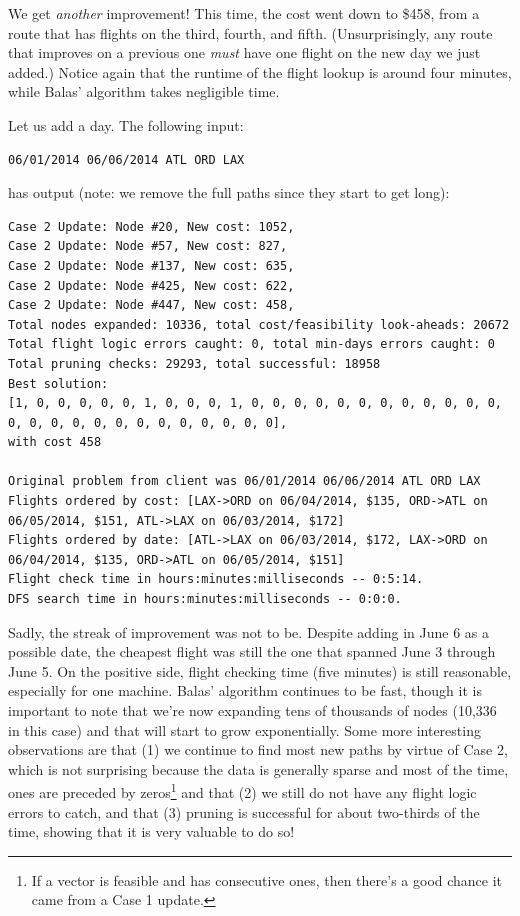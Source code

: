 \documentclass{article}
\begin{document}
We get \emph{another} improvement! This time, the cost went down to \$458, from a route that has flights on the third, fourth, and fifth.
(Unsurprisingly, any route that improves on a previous one \emph{must} have one flight on the new day we just added.) Notice again that the runtime of
the flight lookup is around four minutes, while Balas' algorithm takes negligible time.

Let us add a day. The following input:

\begin{verbatim}
06/01/2014 06/06/2014 ATL ORD LAX
\end{verbatim}

has output (note: we remove the full paths since they start to get long):

\scriptsize
\begin{verbatim}
Case 2 Update: Node #20, New cost: 1052, 
Case 2 Update: Node #57, New cost: 827, 
Case 2 Update: Node #137, New cost: 635, 
Case 2 Update: Node #425, New cost: 622, 
Case 2 Update: Node #447, New cost: 458, 
Total nodes expanded: 10336, total cost/feasibility look-aheads: 20672
Total flight logic errors caught: 0, total min-days errors caught: 0
Total pruning checks: 29293, total successful: 18958
Best solution:
[1, 0, 0, 0, 0, 0, 1, 0, 0, 0, 1, 0, 0, 0, 0, 0, 0, 0, 0, 0, 0, 0, 0, 0, 0, 0, 0, 0, 0, 0, 0, 0, 0, 0, 0, 0],
with cost 458

Original problem from client was 06/01/2014 06/06/2014 ATL ORD LAX
Flights ordered by cost: [LAX->ORD on 06/04/2014, $135, ORD->ATL on 06/05/2014, $151, ATL->LAX on 06/03/2014, $172]
Flights ordered by date: [ATL->LAX on 06/03/2014, $172, LAX->ORD on 06/04/2014, $135, ORD->ATL on 06/05/2014, $151]
Flight check time in hours:minutes:milliseconds -- 0:5:14.
DFS search time in hours:minutes:milliseconds -- 0:0:0.
\end{verbatim}
\normalsize

Sadly, the streak of improvement was not to be. Despite adding in June 6 as a possible date, the cheapest flight was still the one that spanned June 3
through June 5. On the positive side, flight checking time (five minutes) is still reasonable, especially for one machine. Balas' algorithm continues
to be fast, though it is important to note that we're now expanding tens of thousands of nodes (10,336 in this case) and that will start to grow
exponentially. Some more interesting observations are that (1) we continue to find most new paths by virtue of Case 2, which is not surprising because
the data is generally sparse and most of the time, ones are preceded by zeros\footnote{If a vector is feasible and has consecutive ones, then there's
a good chance it came from a Case 1 update.} and that (2) we still do not have any flight logic errors to catch, and that (3) pruning is successful
for about two-thirds of the time, showing that it is very valuable to do so!
\end{document}
